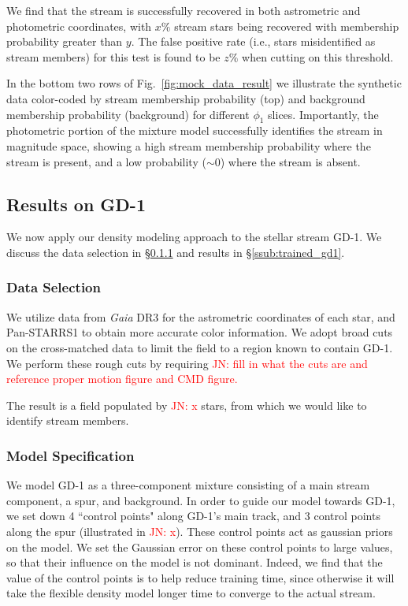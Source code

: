 \documentclass[twocolumn]{aastex631}
\newcommand{\JN}[1]{{\textcolor{red}{JN: #1}}}
\begin{document}
        We find that the stream is successfully recovered in both astrometric and photometric coordinates, with $x\%$ stream stars being recovered with membership probability greater than $y$. The false positive rate (i.e., stars misidentified as stream members) for this test is found to be $z\%$ when cutting on this threshold. 
    
        In the bottom two rows of Fig.~\ref{fig:mock_data_result} we illustrate the synthetic data color-coded by stream membership probability (top) and background membership probability (background) for different $\phi_1$ slices. Importantly, the photometric portion of the mixture model successfully identifies the stream in magnitude space, showing a high stream membership probability where the stream is present, and a low probability ($\sim 0$) where the stream is absent.  
    
    
    \subsection{Results on GD-1} \label{sub:gd1}

        We now apply our density modeling approach to the stellar stream GD-1. We discuss the data selection in \S\ref{ssub:gd1_data} and results in \S\ref{ssub:trained_gd1}.
        
        \subsubsection{Data Selection} \label{ssub:gd1_data}
            We utilize data from {\it Gaia} DR3 for the astrometric coordinates of each star, and Pan-STARRS1 to obtain more accurate color information. We adopt broad cuts on the cross-matched data to limit the field to a region known to contain GD-1. We perform these rough cuts by requiring \JN{fill in what the cuts are and reference proper motion figure and CMD figure.} 

            The result is a field populated by \JN{x} stars, from which we would like to identify stream members.

        \subsubsection{Model Specification}\label{sec:GD_1_ModelSpecification}
    
            We model GD-1 as a three-component mixture consisting of a main stream component, a spur, and background. In order to guide our model towards GD-1, we set down 4 ``control points" along GD-1's main track, and 3 control points along the spur (illustrated in \JN{x}). These control points act as gaussian priors on the model. We set the Gaussian error on these control points to large values, so that their influence on the model is not dominant. Indeed, we find that the value of the control points is to help reduce training time, since otherwise it will take the flexible density model longer time to converge to the actual stream.
    
\end{document}
